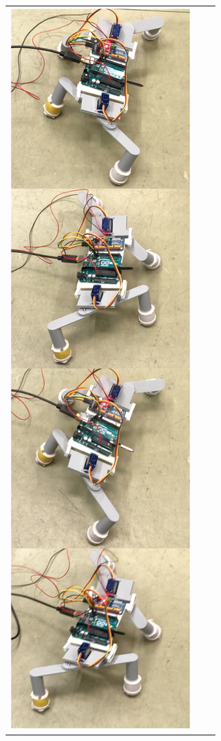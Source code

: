 \documentclass[uplatex,dvipdfmx]{jlreq}
\begin{document}
\begin{figure}[h]
    \begin{tabular}{ccc}
    \begin{minipage}{0.33\hsize}
      \centering 
      \includegraphics[width=\columnwidth]{./figure/pattern1_real.png}

\end{minipage}
\end{tabular}
\end{figure}
\end{document}
